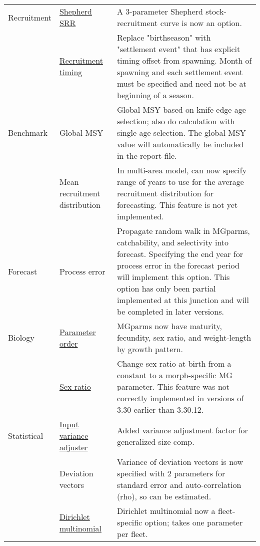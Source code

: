 \begin{center}
{\begin{longtable}{p{2cm} p{3cm} p{10cm}}
		Recruitment
			& \hyperlink{Shepherd}{Shepherd SRR} & 
				A 3-parameter Shepherd stock-recruitment curve is now an option.\\
			& \hyperlink{RecrTiming}{Recruitment timing} & 
				Replace "birthseason" with "settlement event" that has explicit timing offset from spawning.  Month of spawning and each settlement event must be specified and need not be at beginning of a season.\\

		Benchmark 
			& Global MSY &  
				Global MSY based on knife edge age selection; also do calculation with single age selection. The global MSY value will automatically be included in the report file.\\
		
			& Mean recruitment distribution & 
				In multi-area model, can now specify range of years to use for the average recruitment distribution for forecasting. This feature is not yet implemented. \\

		Forecast & 
			Process error & 
				Propagate random walk in MGparms, catchability, and selectivity into forecast. Specifying the end year for process error in the forecast period will implement this option.  This option has only been partial implemented at this junction and will be completed in later versions.\\

		Biology 
			& \hyperlink{MGorder}{Parameter order} & 
				MGparms now have maturity, fecundity, sex ratio, and weight-length by growth pattern.\\
				
		    & \hyperlink{SexRatio}{Sex ratio} & 
			    Change sex ratio at birth from a constant to a morph-specific MG parameter. This feature was not correctly implemented in versions of 3.30 earlier than 3.30.12. \\

		Statistical 
			& \hyperlink{GcompVar}{Input variance adjuster} & 
				Added variance adjustment factor for generalized size comp. \\
			
			& Deviation vectors & 
				Variance of deviation vectors is now specified with 2 parameters for standard error and auto-correlation (rho), so can be estimated.\\
				
			& \hyperlink{Dirichlet}{Dirichlet multinomial} & 
				Dirichlet multinomial now a fleet-specific option; takes one parameter per fleet. \\


\end{longtable}}
\end{center}
